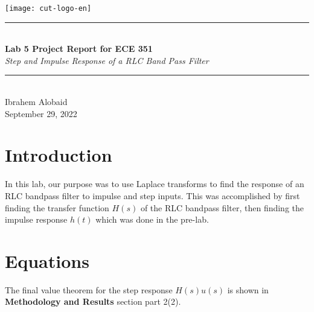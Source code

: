 \documentclass[12pt,a4paper]{article}
\newcommand{\HRule}{\rule{\linewidth}{0.5mm}}
\begin{document}
\begin{titlepage}
\begin{center}
\texttt{[image: cut-logo-en]}~\\[2cm]
\HRule \\[0.4cm]
{ \LARGE 
  \textbf{Lab 5 Project Report for ECE 351}\\[0.4cm]
  \emph{Step and Impulse Response of a RLC Band Pass Filter}\\[0.4cm]
}
\HRule \\[1.5cm]
{ \large
  Ibrahem Alobaid \\[0.1cm]
  September 29, 2022\\[0.1cm]
}
\vfill

\end{center}
\end{titlepage}
\newpage
\tableofcontents
{}
\newpage
\setcounter{page}{1}
\section{Introduction}\label{sec:intro}
    In this lab, our purpose was to use Laplace transforms to find the response of an RLC bandpass filter to impulse and step inputs. This was accomplished by first finding the transfer function $H(s)$ of the RLC bandpass filter, then finding the impulse response $h(t)$ which was done in the pre-lab.

\section{Equations}\label{sec:lit-rev}
    The final value theorem for the step response $H(s)u(s)$ is shown in \textbf{Methodology and Results} section part 2(2).
\end{document}
